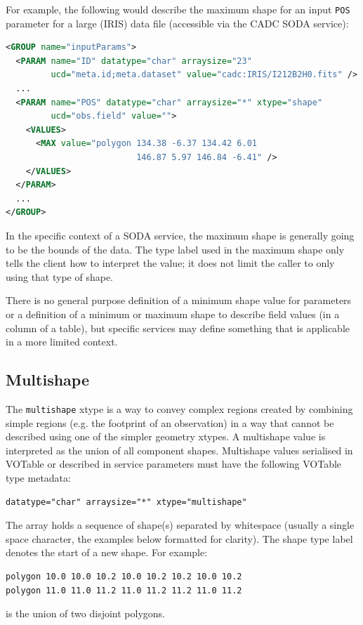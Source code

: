 \documentclass[11pt,letter]{ivoa}
\begin{document}
For example, the following would describe the maximum shape for an input \verb|POS|
parameter for a large (IRIS) data file (accessible via the CADC SODA service):
\begin{lstlisting}[language=XML]
<GROUP name="inputParams">
  <PARAM name="ID" datatype="char" arraysize="23"
         ucd="meta.id;meta.dataset" value="cadc:IRIS/I212B2H0.fits" />
  ...
  <PARAM name="POS" datatype="char" arraysize="*" xtype="shape"
         ucd="obs.field" value="">
    <VALUES>
      <MAX value="polygon 134.38 -6.37 134.42 6.01
                          146.87 5.97 146.84 -6.41" />
    </VALUES>
  </PARAM>
  ...
</GROUP>
\end{lstlisting}
In the specific context of a SODA service, the maximum shape is generally going
to be the bounds of the data. The type label used in the maximum shape only tells
the client how to interpret the value; it does not limit the caller to only using
that type of shape.

There is no general purpose definition of a minimum shape value for parameters or
a definition of a minimum or maximum shape to describe field values (in a column
of a table), but specific services may define something that is applicable in a
more limited context.

\subsection{Multishape}
The \verb|multishape| xtype is a way to convey complex regions created by combining
simple regions (e.g. the footprint of an observation) in a way that cannot be described
using one of the simpler geometry xtypes. A multishape value is interpreted as the union
of all component shapes. Multishape values serialised in VOTable or described in service
parameters must have the following VOTable type metadata:

\begin{verbatim}
datatype="char" arraysize="*" xtype="multishape"
\end{verbatim}

\noindent
The array holds a sequence of shape(s) separated by whitespace (usually a single space
character, the examples below formatted for clarity). The shape type label denotes the
start of a new shape. For example:

\begin{verbatim}
polygon 10.0 10.0 10.2 10.0 10.2 10.2 10.0 10.2
polygon 11.0 11.0 11.2 11.0 11.2 11.2 11.0 11.2
\end{verbatim}
\noindent is the union of two disjoint polygons.
\end{document}
